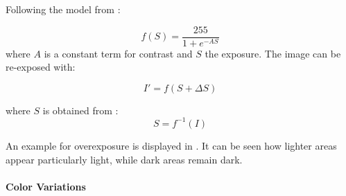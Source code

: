 Following the model from \cite{Carlson2018}:

\begin{equation}
f(S) = \frac{255}{1 + e^{-A S}}
\end{equation}
where $A$ is a constant term for contrast and $S$ the exposure.
The image can be re-exposed with:

\begin{equation}
I' = f(S+\Delta S)
\end{equation}

where $S$ is obtained from :
\begin{equation}
S = f^{-1}(I)
\end{equation}

An example for overexposure is displayed in . It can be seen how lighter areas appear particularly light, while dark areas remain dark.

\paragraph{Color Variations}



